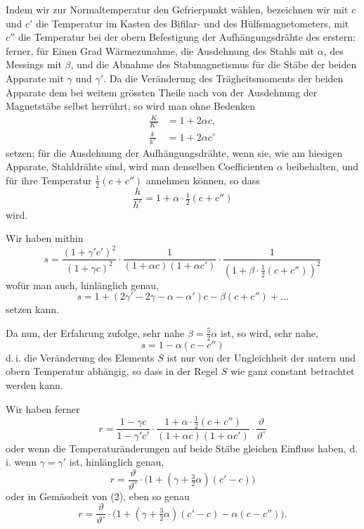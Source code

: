 \documentclass[12pt,a4paper]{article}
\begin{document}
Indem wir zur Normaltemperatur den Gefrierpunkt wählen, bezeichnen wir mit $c$ und $c'$ die Temperatur im Kasten des Bifilar- und des Hülfsmagnetometers, mit $c''$ die Temperatur bei der obern Befestigung der Aufhängungsdrähte des erstern; ferner, für Einen Grad Wärmezunahme, die Ausdehnung des Stahls mit $\alpha$, des Messings mit $\beta$, und die Abnahme des Stabmagnetismus für die Stäbe der beiden Apparate mit $\gamma$ und $\gamma'$. Da die Veränderung des Trägheitsmoments der beiden Apparate dem bei weitem grössten Theile nach von der Ausdehnung der Magnetstäbe selbst herrührt, so wird man ohne Bedenken
\begin{align}
\frac{K}{K^{\circ}} &= 1 + 2\alpha c,\\
\frac{k}{k^{\circ}} &= 1 + 2\alpha c'
\end{align}
setzen; für die Ausdehnung der Aufhängungsdrähte, wenn sie, wie am hiesigen Apparate, Stahldrähte sind, wird man denselben Coefficienten $\alpha$ beibehalten, und für ihre Temperatur $\tfrac{1}{2}(c + c'')$ annehmen können, so dass
\begin{equation}
\frac{h}{h^{\circ}} = 1 + \alpha \cdot \tfrac{1}{2}(c + c'')
\end{equation}
wird.

Wir haben mithin
\begin{equation}
s = \frac{(1 + \gamma' c')^{2}}{(1 + \gamma c)^{2}} \cdot \frac{1}{(1 + \alpha c)(1 + \alpha c')} \cdot \frac{1}{(1 + \beta \cdot \tfrac{1}{2}(c + c''))^{2}}
\end{equation}
wofür man auch, hinlänglich genau,
\begin{equation}
s = 1 + (2\gamma' - 2\gamma - \alpha - \alpha')c - \beta(c + c'') + \dots
\end{equation}
setzen kann.

Da nun, der Erfahrung zufolge, sehr nahe $\beta = \tfrac{5}{2}\alpha$ ist, so wird, sehr nahe,
\begin{equation}
s = 1 - \alpha(c - c'')
\end{equation}
d.\,i. die Veränderung des Elements $S$ ist nur von der Ungleichheit der untern und obern Temperatur abhängig, so dass in der Regel $S$ wie ganz constant betrachtet werden kann.

Wir haben ferner
\begin{equation}
r = \frac{1 - \gamma c}{1 - \gamma' c'} \cdot \frac{1 + \alpha \cdot \tfrac{1}{2}(c + c'')}{(1 + \alpha c)(1 + \alpha c')} \cdot \frac{\vartheta}{\vartheta^{\circ}}
\end{equation}
oder wenn die Temperaturänderungen auf beide Stäbe gleichen Einfluss haben, d.\,i. wenn $\gamma = \gamma'$ ist, hinlänglich genau,
\begin{equation}
r = \frac{\vartheta}{\vartheta^{\circ}} \cdot \bigl(1 + (\gamma + \tfrac{3}{2}\alpha)(c' - c)\bigr)
\end{equation}
oder in Gemässheit von (2), eben so genau
\begin{equation}
r = \frac{\vartheta}{\vartheta^{\circ}} \cdot \bigl(1 + (\gamma + \tfrac{3}{2}\alpha)(c' - c) - \alpha(c - c'')\bigr).
\end{equation}
\end{document}

